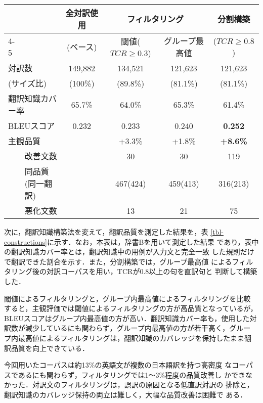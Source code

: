 \begin{table*}[t]
\begin{center}
\caption{構築方法を変えたときの翻訳品質(辞書B使用時)}
\label{tbl-constructions}
{
\smalltable
\begin{tabular}{p{5pt}l|c|c|c|c}
\hline\hline
& & 全対訳使用 & \multicolumn{2}{c|}{フィルタリング}   & 分割構築 \\
\cline{4-5}
& & (ベース)   & 閾値($TCR \geq 0.3$) & グループ最高値 & ($TCR \geq 0.8$)\\
\hline
\multicolumn{2}{l|}{対訳数}
	         & 149,882 & 134,521  & 121,623  & 121,623 \\
\multicolumn{2}{l|}{(サイズ比)}
	         & (100\%) & (89.8\%) & (81.1\%) & (81.1\%) \\
\hline
\multicolumn{2}{l|}{翻訳知識カバー率}
		 & 65.7\%  &  64.0\%  & 65.3\%   & 61.4\%   \\
\hline
\multicolumn{2}{l|}{BLEUスコア}
	         & 0.232   & 0.233    & 0.240    & {\bf 0.252}    \\
\hline
\multicolumn{2}{l|}{主観品質}
		 &	   & +3.3\%   & +1.8\%   & {\bf +8.6\%}   \\
& 改善文数 	 &	   & 30       & 30       & 119      \\
& 同品質(同一翻訳) &	   & 467(424) & 459(413) & 316(213) \\
& 悪化文数 	 &	   & 13       & 21       & 75       \\
\hline\hline
\end{tabular}
}
\end{center}
\end{table*}

次に，翻訳知識構築法を変えて，翻訳品質を測定した結果を，表
\ref{tbl-constructions}に示す．なお，本表は，辞書Bを用いて測定した結果
であり，表中の翻訳知識カバー率とは，翻訳知識中の用例が入力文と完全一致
した規則だけで翻訳できた割合を示す．また，分割構築では，グループ最高値
によるフィルタリング後の対訳コーパスを用い，TCRが0.8以上の句を直訳句と
判断して構築した．

閾値によるフィルタリングと，グループ内最高値によるフィルタリングを比較
すると，主観評価では閾値によるフィルタリングの方が高品質となっているが，
BLEUスコアはグループ内最高値の方が高い．翻訳知識カバー率も，使用した対
訳数が減少しているにも関わらず，グループ内最高値の方が若干高く，グルー
プ内最高値によるフィルタリングは，翻訳知識のカバレッジを保持したまま翻
訳品質を向上できている．

今回用いたコーパスは約13\%の英語文が複数の日本語訳を持つ高密度
なコーパスであるにも関わらず，フィルタリングでは1〜3\%程度の品質改善し
かできなかった．対訳文のフィルタリングは，誤訳の原因となる低直訳対訳の
排除と，翻訳知識のカバレッジ保持の両立は難しく，大幅な品質改善は困難で
ある．

